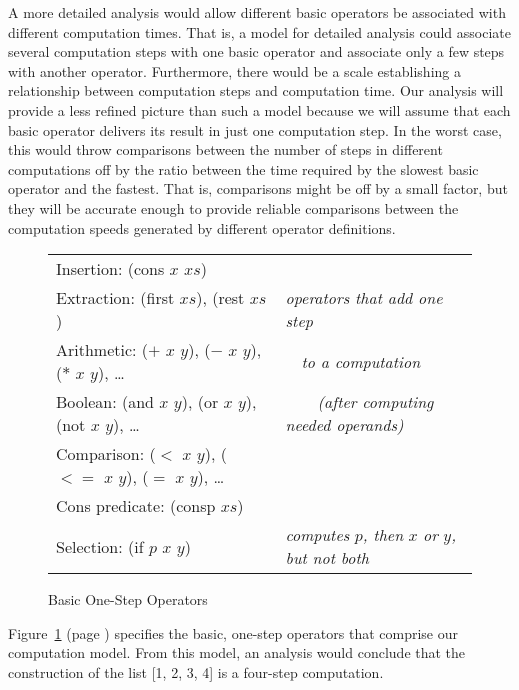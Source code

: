 A more detailed analysis would allow different
basic operators be associated with different computation times.
That is, a model for detailed analysis could associate
several computation steps with one basic operator
and associate only a few steps with another operator.
Furthermore, there
would be a scale establishing a relationship between
computation steps and computation time.
Our analysis will provide a less refined picture than such
a model because we will assume that each basic operator
delivers its result in just one computation step.
In the worst case, this would throw comparisons between
the number of steps in different computations off
by the ratio between the time required by the slowest basic
operator and the fastest. That is, comparisons
might be off by a small factor,
but they will be accurate enough to provide
reliable comparisons between the computation speeds
generated by different operator definitions.

\begin{figure}
\begin{center}
\begin{tabular}{ll}
Insertion: (cons $x$ $xs$)                                       & \\
Extraction: (first $xs$), (rest $xs$)                            & \emph{operators that add one step}           \\
Arithmetic: ($+$ $x$ $y$), ($-$ $x$ $y$), ($*$ $x$ $y$), \dots   & ~~\emph{to a computation}                    \\
Boolean: (and $x$ $y$), (or $x$ $y$), (not $x$ $y$), \dots       & ~~~~\emph{(after computing needed operands)} \\
Comparison: ($<$ $x$ $y$), ($<=$ $x$ $y$), ($=$ $x$ $y$), \dots  & \\
Cons predicate: (consp $xs$)                                     & \\
Selection: (if $p$ $x$ $y$)                                      & \emph{computes} $p$\emph{, then} $x$ \emph{or} $y$\emph{, but not both}
\end{tabular}
\end{center}
\caption{Basic One-Step Operators}
\label{fig:basic-one-step-ops}
\end{figure}


Figure~\ref{fig:basic-one-step-ops} (page \pageref{fig:basic-one-step-ops})
specifies the basic, one-step operators that comprise
our computation model.
From this model, an analysis would conclude
that the construction of the list [1, 2, 3, 4] is a
four-step computation.


